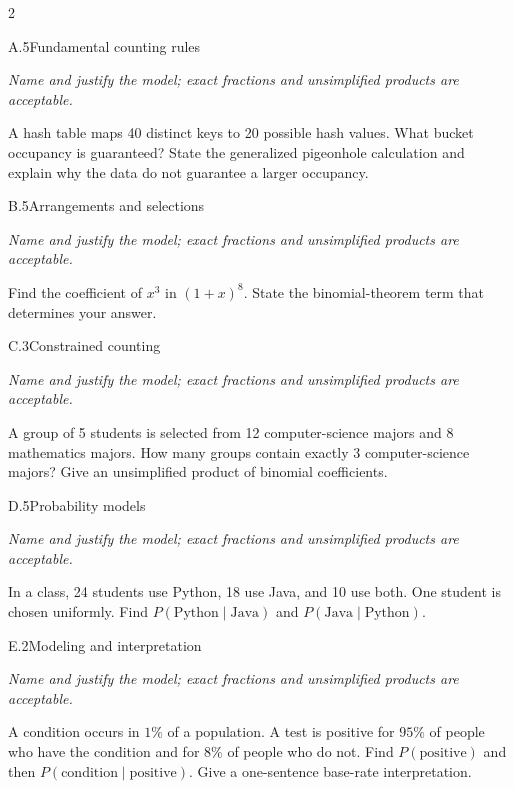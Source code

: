 \documentclass[9pt]{extarticle}
\begin{document}
\begin{multicols}{2}
\begin{CoreProblem}{A.5}{Fundamental counting rules}
{\scriptsize\textit{Name and justify the model; exact fractions and unsimplified products are acceptable.}\par}
A hash table maps 40 distinct keys to 20 possible hash values. What
    bucket occupancy is guaranteed? State the generalized pigeonhole calculation
    and explain why the data do not guarantee a larger occupancy.
\end{CoreProblem}
\begin{CoreProblem}{B.5}{Arrangements and selections}
{\scriptsize\textit{Name and justify the model; exact fractions and unsimplified products are acceptable.}\par}
Find the coefficient of $x^3$ in $(1+x)^8$. State the binomial-theorem
    term that determines your answer.
\end{CoreProblem}
\begin{CoreProblem}{C.3}{Constrained counting}
{\scriptsize\textit{Name and justify the model; exact fractions and unsimplified products are acceptable.}\par}
A group of 5 students is selected from 12 computer-science majors and
    8 mathematics majors. How many groups contain exactly 3 computer-science
    majors? Give an unsimplified product of binomial coefficients.
\end{CoreProblem}
\columnbreak
\begin{CoreProblem}{D.5}{Probability models}
{\scriptsize\textit{Name and justify the model; exact fractions and unsimplified products are acceptable.}\par}
In a class, 24 students use Python, 18 use Java, and 10 use both.
    One student is chosen uniformly. Find
    $P(\text{Python}\mid\text{Java})$ and
    $P(\text{Java}\mid\text{Python})$.
\end{CoreProblem}
\begin{CoreProblem}{E.2}{Modeling and interpretation}
{\scriptsize\textit{Name and justify the model; exact fractions and unsimplified products are acceptable.}\par}
A condition occurs in $1\%$ of a population. A test is positive for
    $95\%$ of people who have the condition and for $8\%$ of people who do not.
    Find $P(\text{positive})$ and then
    $P(\text{condition}\mid\text{positive})$. Give a one-sentence base-rate
    interpretation.
\end{CoreProblem}
\end{multicols}
\end{document}
